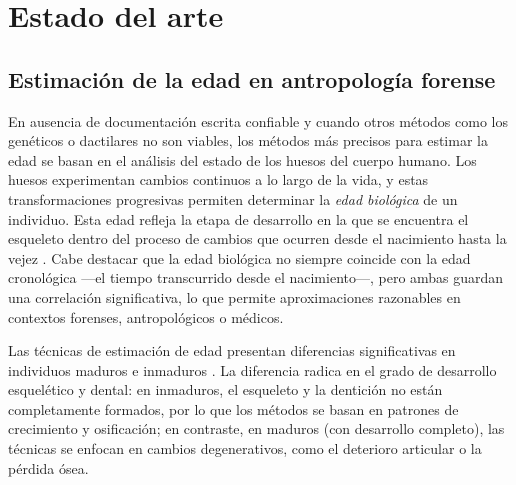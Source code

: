 \chapter{Estado del arte}


\section{Estimación de la edad en antropología forense}

En ausencia de documentación escrita confiable y cuando otros métodos como los genéticos o dactilares no son
viables, los métodos más precisos para estimar la edad se basan en el 
análisis del estado de los huesos del cuerpo humano. Los huesos experimentan cambios continuos a lo largo de 
la vida, y estas transformaciones progresivas permiten determinar la \textit{edad biológica} de 
un individuo. Esta edad refleja la etapa de desarrollo en la que se encuentra el esqueleto dentro del proceso 
de cambios que ocurren desde el nacimiento hasta la vejez \cite{byers2023}.
Cabe destacar que la edad biológica no siempre coincide con la edad cronológica ---el tiempo transcurrido 
desde el nacimiento---, pero ambas guardan una correlación significativa, lo que permite aproximaciones 
razonables en contextos forenses, antropológicos o médicos.

Las técnicas de estimación de edad presentan diferencias significativas en individuos maduros e inmaduros
\cite{ubelaker2019}. La diferencia radica en el grado de desarrollo esquelético y dental: en inmaduros, el 
esqueleto y la dentición no están completamente formados, por lo que los métodos se basan en patrones de 
crecimiento y osificación; en contraste, en maduros (con desarrollo completo), las técnicas se enfocan en 
cambios degenerativos, como el deterioro articular o la pérdida ósea.



